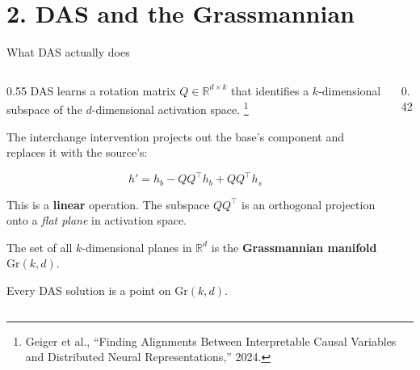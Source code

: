 \documentclass[aspectratio=169,11pt]{beamer}
\newcommand{\Gr}{\mathrm{Gr}}
\newcommand{\R}{\mathbb{R}}
\begin{document}
\hypertarget{sec2}{}
\section{2. DAS and the Grassmannian}

\begin{frame}{What DAS actually does}

\begin{columns}[T]
\begin{column}{0.55\textwidth}
{\small DAS learns a rotation matrix $Q \in \R^{d \times k}$ that identifies a $k$-dimensional subspace of the $d$-dimensional activation space.}%
\footnote{\tiny Geiger et al., ``Finding Alignments Between Interpretable Causal Variables and Distributed Neural Representations,'' 2024.}

\vspace{0.3em}
{\small The interchange intervention projects out the base's component and replaces it with the source's:}

$$h' = h_b - QQ^\top h_b + QQ^\top h_s$$

{\small This is a \textbf{linear} operation. The subspace $QQ^\top$ is an orthogonal projection onto a \emph{flat plane} in activation space.}

\vspace{0.3em}
{\small The set of all $k$-dimensional planes in $\R^d$ is the \textbf{Grassmannian manifold} $\Gr(k,d)$.}

\vspace{0.3em}
{\small Every DAS solution is a point on $\Gr(k,d)$.}
\end{column}
\begin{column}{0.42\textwidth}
\end{column}
\end{columns}
\end{frame}
\end{document}
